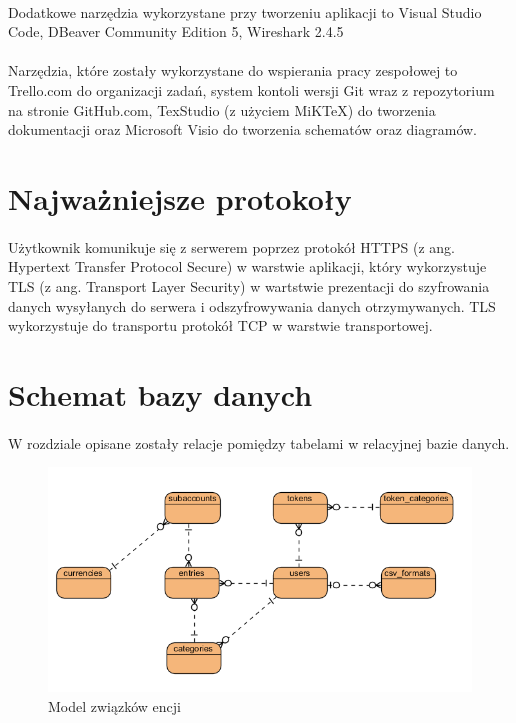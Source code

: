 \documentclass{article}
\begin{document}
	\paragraph*{} Dodatkowe narzędzia wykorzystane przy tworzeniu aplikacji to Visual Studio Code, DBeaver Community Edition 5, Wireshark 2.4.5
	\paragraph*{} Narzędzia, które zostały wykorzystane do wspierania pracy zespołowej to Trello.com do organizacji zadań, system kontoli wersji Git wraz z repozytorium na stronie GitHub.com, TexStudio (z użyciem MiKTeX) do tworzenia dokumentacji oraz Microsoft Visio do tworzenia schematów oraz diagramów.
	\section{Najważniejsze protokoły}
	\paragraph*{}
	Użytkownik komunikuje się z serwerem poprzez protokół HTTPS (z ang. Hypertext Transfer Protocol Secure) w warstwie aplikacji, który wykorzystuje TLS (z ang. Transport Layer Security) w wartstwie prezentacji do szyfrowania danych wysyłanych do serwera i odszyfrowywania danych otrzymywanych. TLS wykorzystuje do transportu protokół TCP w warstwie transportowej.
	\section{Schemat bazy danych}
	\paragraph{} W rozdziale opisane zostały relacje pomiędzy tabelami w relacyjnej bazie danych.
	\begin{figure}[H]
		\centering
		\includegraphics[width=0.8\linewidth]{assets/bd2.png}
		\caption[]{Model związków encji}
		\label{fig:erd}
	\end{figure}
\end{document}
